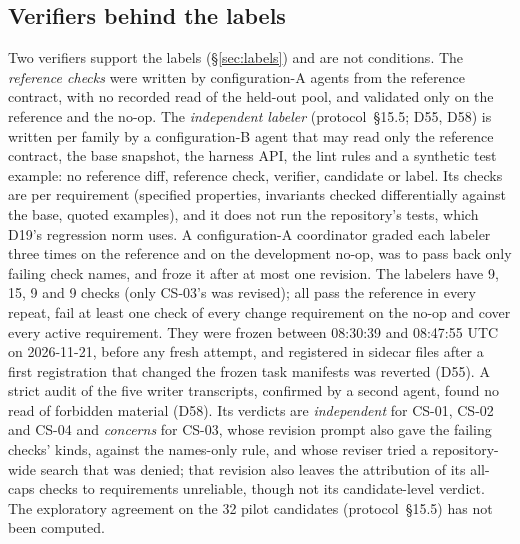 \subsection{Verifiers behind the labels}
\label{sec:labelers}
Two verifiers support the labels (\S\ref{sec:labels}) and are not conditions. The \emph{reference checks} were written by configuration-A agents from the reference contract, with no recorded read of the held-out pool, and validated only on the reference and the no-op. The \emph{independent labeler} (protocol~\S15.5; D55, D58) is written per family by a configuration-B agent that may read only the reference contract, the base snapshot, the harness API, the lint rules and a synthetic test example: no reference diff, reference check, verifier, candidate or label. Its checks are per requirement (specified properties, invariants checked differentially against the base, quoted examples), and it does not run the repository's tests, which D19's regression norm uses. A configuration-A coordinator graded each labeler three times on the reference and on the development no-op, was to pass back only failing check names, and froze it after at most one revision. The labelers have 9, 15, 9 and 9 checks (only CS-03's was revised); all pass the reference in every repeat, fail at least one check of every change requirement on the no-op and cover every active requirement. They were frozen between 08:30:39 and 08:47:55 UTC on 2026-11-21, before any fresh attempt, and registered in sidecar files after a first registration that changed the frozen task manifests was reverted (D55). A strict audit of the five writer transcripts, confirmed by a second agent, found no read of forbidden material (D58). Its verdicts are \emph{independent} for CS-01, CS-02 and CS-04 and \emph{concerns} for CS-03, whose revision prompt also gave the failing checks' kinds, against the names-only rule, and whose reviser tried a repository-wide search that was denied; that revision also leaves the attribution of its all-caps checks to requirements unreliable, though not its candidate-level verdict. The exploratory agreement on the 32 pilot candidates (protocol~\S15.5) has not been computed.


